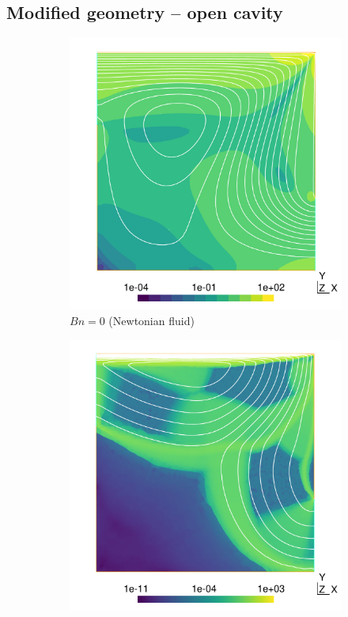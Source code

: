 \documentclass[11 pt]{report}
\begin{document}
\FloatBarrier
\subsection{Modified geometry -- open cavity}

\begin{figure}[h]
    \centering
    \begin{subfigure}[t]{0.495\textwidth}
        \includegraphics[width=\textwidth]{../figures/opencavity_0.pdf}
        \caption{$Bn=0$ (Newtonian fluid)}
        \label{fig:opencavity0}
    \end{subfigure}
    \begin{subfigure}[t]{0.495\textwidth}
        \includegraphics[width=\textwidth]{../figures/opencavity_100.pdf}

\end{subfigure}
\end{figure}
\end{document}
